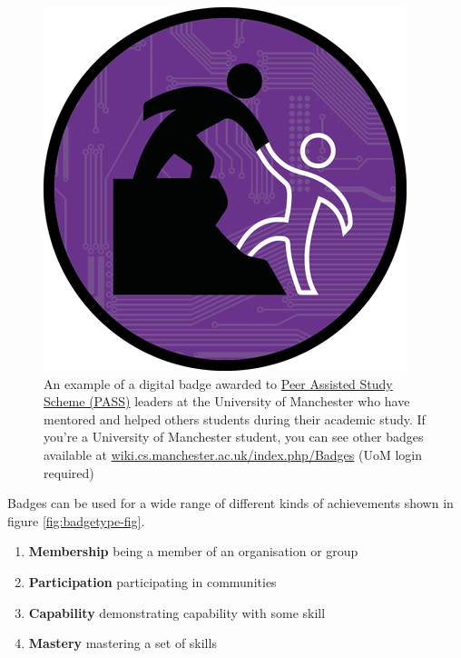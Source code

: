 \documentclass[
]{book}
\providecommand{\tightlist}{%
  \setlength{\itemsep}{0pt}\setlength{\parskip}{0pt}}
\begin{document}
\begin{figure}

{\centering \includegraphics[width=0.8\linewidth]{images/pass-leader-badge} 

}

\caption{An example of a digital badge awarded to \href{http://www.peersupport.manchester.ac.uk/}{Peer Assisted Study Scheme (PASS)} leaders at the University of Manchester who have mentored and helped others students during their academic study. If you're a University of Manchester student, you can see other badges available at \href{https://wiki.cs.manchester.ac.uk/index.php/Badges}{wiki.cs.manchester.ac.uk/index.php/Badges} (UoM login required)}\label{fig:pass-leader-fig}
\end{figure}



Badges can be used for a wide range of different kinds of achievements shown in figure \ref{fig:badgetype-fig}.

\begin{enumerate}
\def\labelenumi{\arabic{enumi}.}
\tightlist
\item
  \textbf{Membership} being a member of an organisation or group
\item
  \textbf{Participation} participating in communities
\item
  \textbf{Capability} demonstrating capability with some skill
\item
  \textbf{Mastery} mastering a set of skills
\end{enumerate}
\end{document}
